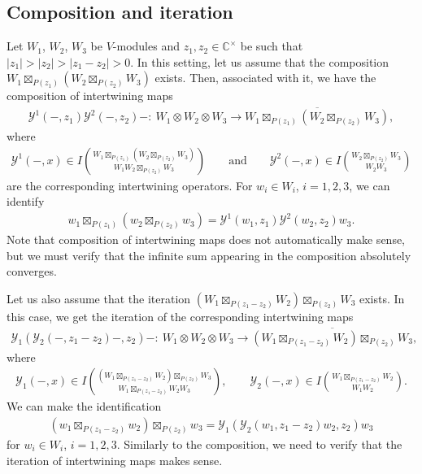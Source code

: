 \documentclass[pdftex]{sigma}
\numberwithin{equation}{section}
\newcommand{\ol}[1]{\overline{#1}}
\newcommand{\bC}{\mathbb{C}}
\newcommand{\voagen}{V}
\newcommand{\voamodgen}{W}
\newcommand{\voaint}{\mathcal{Y}}
\newcommand{\inttyp}[3]{\binom{#3}{#1 #2}}
\newcommand{\intsp}[3]{I\inttyp{#1}{#2}{#3}}
\newcommand{\vmodvec}{w}
\begin{document}
\subsection{Composition and iteration}
Let $\voamodgen_{1}$, $\voamodgen_{2}$, $\voamodgen_{3}$ be $\voagen$-modules and $z_{1},z_{2}\in \bC^{\times}$ be such that $|z_{1}|>|z_{2}|>|z_{1}-z_{2}|>0$.
In this setting, let us assume that the composition
$
 \voamodgen_{1}\boxtimes_{P(z_{1})}(\voamodgen_{2}\boxtimes_{P(z_{2})}\voamodgen_{3})
$
exists.
Then, associated with it, we have the composition of intertwining maps
\begin{gather*}
 \voaint^{1}(-,z_{1})\voaint^{2}(-,z_{2})-\colon\ \voamodgen_{1}\otimes \voamodgen_{2}\otimes\voamodgen_{3}\to \ol{\voamodgen_{1}\boxtimes_{P(z_{1})}(\voamodgen_{2}\boxtimes_{P(z_{2})}\voamodgen_{3})},
\end{gather*}
where
\begin{gather*}\voaint^{1}(-,x)\in \intsp{\voamodgen_{1}}{\voamodgen_{2}\boxtimes_{P(z_{2})}\voamodgen_{3}}{\voamodgen_{1}\boxtimes_{P(z_{1})}(\voamodgen_{2}\boxtimes_{P(z_{2})}\voamodgen_{3})}\qquad \mbox{and}\qquad
\voaint^{2}(-,x)\in \intsp{\voamodgen_{2}}{\voamodgen_{3}}{\voamodgen_{2}\boxtimes_{P(z_{2})}\voamodgen_{3}}
\end{gather*}
are the corresponding intertwining operators.
For $\vmodvec_{i}\in\voamodgen_{i}$, $i=1,2,3$, we can identify
\begin{gather*}
 \vmodvec_{1}\boxtimes_{P(z_{1})}(\vmodvec_{2}\boxtimes_{P(z_{2})}\vmodvec_{3})=\voaint^{1}(\vmodvec_{1},z_{1})\voaint^{2}(\vmodvec_{2},z_{2})\vmodvec_{3}.
\end{gather*}
Note that composition of intertwining maps does not automatically make sense,
but we must verify that the infinite sum appearing in the composition absolutely converges.

Let us also assume that the iteration
$
 (\voamodgen_{1}\boxtimes_{P(z_{1}-z_{2})}\voamodgen_{2})\boxtimes_{P(z_{2})}\voamodgen_{3}
$
exists.
In this case, we get the iteration of the corresponding intertwining maps
\begin{gather*}
 \voaint_{1} (\voaint_{2}(-,z_{1}-z_{2})-,z_{2} )-\colon\ \voamodgen_{1}\otimes \voamodgen_{2}\otimes \voamodgen_{3}\to \ol{(\voamodgen_{1}\boxtimes_{P(z_{1}-z_{2})}\voamodgen_{2})\boxtimes_{P(z_{2})}\voamodgen_{3}},
\end{gather*}
where
\begin{gather*}
 \voaint_{1}(-,x)\in\intsp{\voamodgen_{1}\boxtimes_{P(z_{1}-z_{2})}\voamodgen_{2}}{\voamodgen_{3}}{(\voamodgen_{1}\boxtimes_{P(z_{1}-z_{2})}\voamodgen_{2})\boxtimes_{P(z_{2})}\voamodgen_{3}},\qquad
 \voaint_{2}(-,x)\in \intsp{\voamodgen_{1}}{\voamodgen_{2}}{\voamodgen_{1}\boxtimes_{P(z_{1}-z_{2})}\voamodgen_{2}}.
\end{gather*}
We can make the identification
\begin{gather*}
 (\vmodvec_{1}\boxtimes_{P(z_{1}-z_{2})}\vmodvec_{2})\boxtimes_{P(z_{2})}\vmodvec_{3}=\voaint_{1}\left(\voaint_{2}(\vmodvec_{1},z_{1}-z_{2})\vmodvec_{2},z_{2}\right)\vmodvec_{3}
\end{gather*}
for $\vmodvec_{i}\in \voamodgen_{i}$, $i=1,2,3$.
Similarly to the composition, we need to verify that the iteration of intertwining maps makes sense.
\end{document}
